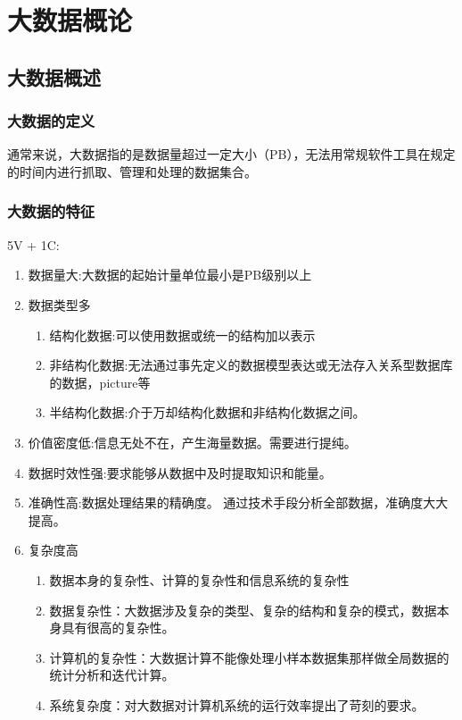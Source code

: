 \documentclass{article}
\begin{document}
 
 
\section{大数据概论}
\subsection{大数据概述}
\subsubsection{大数据的定义}
通常来说，大数据指的是数据量超过一定大小（PB），无法用常规软件工具在规定的时间内进行抓取、管理和处理的数据集合。\\
\subsubsection{大数据的特征}
5V + 1C:
\begin{enumerate}[1]
    \item 数据量大:大数据的起始计量单位最小是PB级别以上
    \item 数据类型多
          \begin{enumerate}
              \item 结构化数据:可以使用数据或统一的结构加以表示
              \item 非结构化数据:无法通过事先定义的数据模型表达或无法存入关系型数据库的数据，picture等
              \item 半结构化数据:介于万却结构化数据和非结构化数据之间。
          \end{enumerate}
    \item 价值密度低:信息无处不在，产生海量数据。需要进行提纯。
    \item 数据时效性强:要求能够从数据中及时提取知识和能量。
    \item 准确性高:数据处理结果的精确度。 通过技术手段分析全部数据，准确度大大提高。
    \item 复杂度高
          \begin{enumerate}
              \item 数据本身的复杂性、计算的复杂性和信息系统的复杂性
              \item 数据复杂性：大数据涉及复杂的类型、复杂的结构和复杂的模式，数据本身具有很高的复杂性。
              \item 计算机的复杂性：大数据计算不能像处理小样本数据集那样做全局数据的统计分析和迭代计算。
              \item 系统复杂度：对大数据对计算机系统的运行效率提出了苛刻的要求。
          \end{enumerate}
\end{enumerate}
\end{document}
